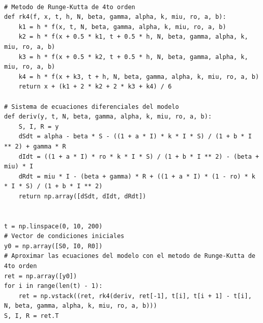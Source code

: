 \documentclass{article}
\begin{document}
\begin{lstlisting}[label={lst:runge_kutta}]

# Metodo de Runge-Kutta de 4to orden
def rk4(f, x, t, h, N, beta, gamma, alpha, k, miu, ro, a, b):
    k1 = h * f(x, t, N, beta, gamma, alpha, k, miu, ro, a, b)
    k2 = h * f(x + 0.5 * k1, t + 0.5 * h, N, beta, gamma, alpha, k, miu, ro, a, b)
    k3 = h * f(x + 0.5 * k2, t + 0.5 * h, N, beta, gamma, alpha, k, miu, ro, a, b)
    k4 = h * f(x + k3, t + h, N, beta, gamma, alpha, k, miu, ro, a, b)
    return x + (k1 + 2 * k2 + 2 * k3 + k4) / 6

# Sistema de ecuaciones diferenciales del modelo
def deriv(y, t, N, beta, gamma, alpha, k, miu, ro, a, b):
    S, I, R = y
    dSdt = alpha - beta * S - ((1 + a * I) * k * I * S) / (1 + b * I ** 2) + gamma * R
    dIdt = ((1 + a * I) * ro * k * I * S) / (1 + b * I ** 2) - (beta + miu) * I
    dRdt = miu * I - (beta + gamma) * R + ((1 + a * I) * (1 - ro) * k * I * S) / (1 + b * I ** 2)
    return np.array([dSdt, dIdt, dRdt])


t = np.linspace(0, 10, 200)    
# Vector de condiciones iniciales
y0 = np.array([S0, I0, R0])
# Aproximar las ecuaciones del modelo con el metodo de Runge-Kutta de 4to orden
ret = np.array([y0])
for i in range(len(t) - 1):
    ret = np.vstack((ret, rk4(deriv, ret[-1], t[i], t[i + 1] - t[i], N, beta, gamma, alpha, k, miu, ro, a, b)))
S, I, R = ret.T

\end{lstlisting}
\end{document}

